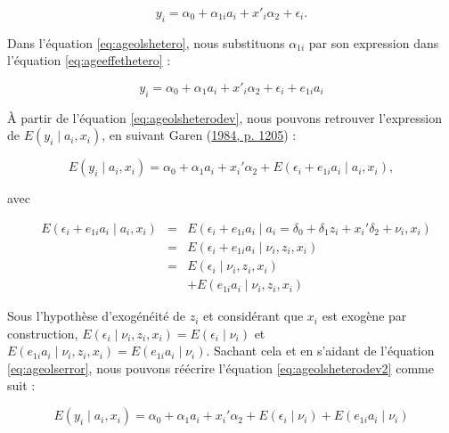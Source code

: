 \documentclass[
]{book}
\begin{document}
\begin{equation}
\label{eq:ageolshetero}
y_{i} = \alpha_0 + \alpha_{1i} a_{i} + x'_{i} \alpha_2 + \epsilon_{i}.
\end{equation}

Dans l'équation \eqref{eq:ageolshetero}, nous substituons \(\alpha_{1i}\) par son expression dans l'équation \eqref{eq:ageeffethetero} :

\begin{equation}
\label{eq:ageolsheterodev}
y_{i} = \alpha_0 + \alpha_1 a_{i} + x'_{i} \alpha_2 + \epsilon_{i} + e_{1i} a_{i}
\end{equation}

À partir de l'équation \eqref{eq:ageolsheterodev}, nous pouvons retrouver l'expression de \(E(y_i \mid a_i, x_i)\), en suivant Garen (\protect\hyperlink{ref-GAR:84}{1984, p. 1205}) :

\begin{equation}
\label{eq:ageolsheterodev2}
E(y_i \mid a_i, x_i) = \alpha_0 + \alpha_1 a_i + x_i' \alpha_2 + E(\epsilon_i +e_{1i} a_i \mid a_i, x_i),
\end{equation}

avec

\begin{equation}
\label{eq:ageolserror}
\begin{aligned}
& E(\epsilon_i +e_{1i} a_i \mid a_i, x_i) &=& 
E(\epsilon_i +e_{1i} a_i \mid a_i = \delta_0 + \delta_1 z_i + x_i'\delta_2 + \nu_i, x_i) \\
& &=& E(\epsilon_i + e_{1i} a_i \mid \nu_i, z_i, x_i) \\
& &=& E(\epsilon_i \mid \nu_i, z_i, x_i) \\
& && + E(e_{1i} a_i \mid \nu_i, z_i, x_i)
\end{aligned}
\end{equation}

Sous l'hypothèse d'exogénéité de \(z_i\) et considérant que \(x_i\) est exogène par construction, \(E(\epsilon_i \mid \nu_i, z_i, x_i) = E(\epsilon_i \mid \nu_i)\) et \(E(e_{1i} a_i \mid \nu_i, z_i, x_i) = E(e_{1i} a_i \mid \nu_i)\). Sachant cela et en s'aidant de l'équation \eqref{eq:ageolserror}, nous pouvons réécrire l'équation \eqref{eq:ageolsheterodev2} comme suit :

\begin{equation}
\label{eq:ageolsheterodev3}
E(y_i \mid a_i, x_i) = \alpha_0 + \alpha_1 a_i + x_i' \alpha_2 + E(\epsilon_i \mid \nu_i) + E(e_{1i} a_i \mid \nu_i) 
\end{equation}
\end{document}
